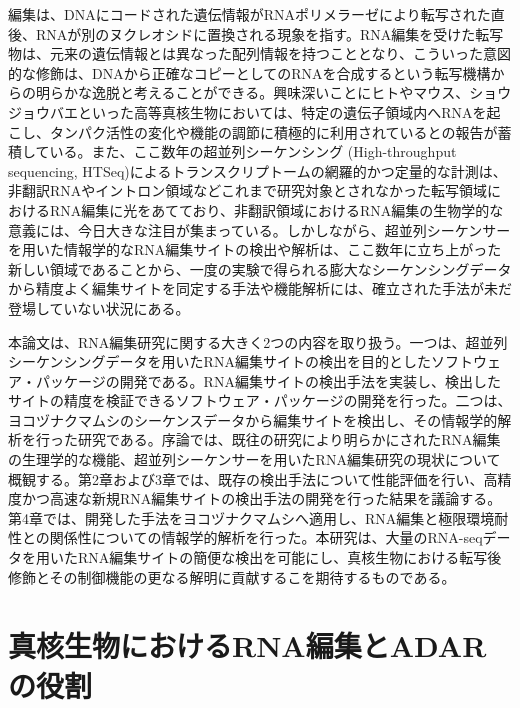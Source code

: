編集は、DNAにコードされた遺伝情報がRNAポリメラーゼにより転写された直後、RNAが別のヌクレオシドに置換される現象を指す。RNA編集を受けた転写物は、元来の遺伝情報とは異なった配列情報を持つこととなり、こういった意図的な修飾は、DNAから正確なコピーとしてのRNAを合成するという転写機構からの明らかな逸脱と考えることができる。興味深いことにヒトやマウス、ショウジョウバエといった高等真核生物においては、特定の遺伝子領域内へRNAを起こし、タンパク活性の変化や機能の調節に積極的に利用されているとの報告が蓄積している。また、ここ数年の超並列シーケンシング (High-throughput sequencing, HTSeq)によるトランスクリプトームの網羅的かつ定量的な計測は、非翻訳RNAやイントロン領域などこれまで研究対象とされなかった転写領域におけるRNA編集に光をあてており、非翻訳領域におけるRNA編集の生物学的な意義には、今日大きな注目が集まっている。しかしながら、超並列シーケンサーを用いた情報学的なRNA編集サイトの検出や解析は、ここ数年に立ち上がった新しい領域であることから、一度の実験で得られる膨大なシーケンシングデータから精度よく編集サイトを同定する手法や機能解析には、確立された手法が未だ登場していない状況にある。
\par
本論文は、RNA編集研究に関する大きく2つの内容を取り扱う。一つは、超並列シーケンシングデータを用いたRNA編集サイトの検出を目的としたソフトウェア・パッケージの開発である。RNA編集サイトの検出手法を実装し、検出したサイトの精度を検証できるソフトウェア・パッケージの開発を行った。二つは、ヨコヅナクマムシのシーケンスデータから編集サイトを検出し、その情報学的解析を行った研究である。序論では、既往の研究により明らかにされたRNA編集の生理学的な機能、超並列シーケンサーを用いたRNA編集研究の現状について概観する。第2章および3章では、既存の検出手法について性能評価を行い、高精度かつ高速な新規RNA編集サイトの検出手法の開発を行った結果を議論する。第4章では、開発した手法をヨコヅナクマムシへ適用し、RNA編集と極限環境耐性との関係性についての情報学的解析を行った。本研究は、大量のRNA-seqデータを用いたRNA編集サイトの簡便な検出を可能にし、真核生物における転写後修飾とその制御機能の更なる解明に貢献するこを期待するものである。

\newpage

\section{真核生物におけるRNA編集とADARの役割}
